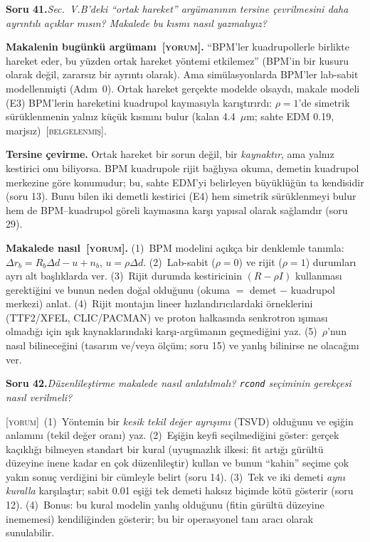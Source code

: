 \documentclass[11pt,a4paper]{article}
\newcommand{\kod}[1]{{\XeTeXinterchartokenstate=0\texttt{#1}}}
\newcommand{\BEL}{\textsc{[belgelenmiş]}}
\newcommand{\YOR}{\textsc{[yorum]}}
\newcounter{soru}
\newcommand{\soru}[2]{%
  \par\medskip\noindent\textbf{Soru #1.}\enspace\textit{#2}\par\nopagebreak\smallskip}
\begin{document}
\soru{41}{Sec.~V.B'deki ``ortak hareket'' argümanının tersine çevrilmesini daha ayrıntılı açıklar mısın?
Makalede bu kısmı nasıl yazmalıyız?}

\textbf{Makalenin bugünkü argümanı~\YOR.} ``BPM'ler kuadrupollerle birlikte hareket eder, bu yüzden ortak
hareket yöntemi etkilemez'' (BPM'in bir kusuru olarak değil, zararsız bir ayrıntı olarak). Ama
simülasyonlarda BPM'ler lab-sabit modellenmişti (Adım~0). Ortak hareket gerçekte modelde olsaydı, makale
modeli (E3) BPM'lerin hareketini kuadrupol kaymasıyla karıştırırdı: $\rho=1$'de simetrik sürüklenmenin
yalnız küçük kısmını bulur (kalan 4.4~$\mu$m; sahte EDM 0.19, marjsız)~\BEL.

\textbf{Tersine çevirme.} Ortak hareket bir sorun değil, bir \emph{kaynaktır}, ama yalnız kestirici onu
biliyorsa. BPM kuadrupole rijit bağlıysa okuma, demetin kuadrupol merkezine göre konumudur; bu, sahte EDM'yi
belirleyen büyüklüğün ta kendisidir (soru 13). Bunu bilen iki demetli kestirici (E4) hem simetrik
sürüklenmeyi bulur hem de BPM--kuadrupol göreli kaymasına karşı yapısal olarak sağlamdır (soru 29).

\textbf{Makalede nasıl~\YOR.} (1)~BPM modelini açıkça bir denklemle tanımla: $\Delta r_b=R_b\Delta d-u+n_b$,
$u=\rho\Delta d$. (2)~Lab-sabit ($\rho=0$) ve rijit ($\rho=1$) durumları ayrı alt başlıklarda ver.
(3)~Rijit durumda kestiricinin $(R-\rho I)$ kullanması gerektiğini ve bunun neden doğal olduğunu
(okuma $=$ demet $-$ kuadrupol merkezi) anlat. (4)~Rijit montajın lineer hızlandırıcılardaki örneklerini
(TTF2/XFEL, CLIC/PACMAN) ve proton halkasında senkrotron ışıması olmadığı için ışık kaynaklarındaki
karşı-argümanın geçmediğini yaz. (5)~$\rho$'nun nasıl bilineceğini (tasarım ve/veya ölçüm; soru 15) ve
yanlış bilinirse ne olacağını ver.

\soru{42}{Düzenlileştirme makalede nasıl anlatılmalı? \kod{rcond} seçiminin gerekçesi nasıl verilmeli?}

\YOR~(1)~Yöntemin bir \emph{kesik tekil değer ayrışımı} (TSVD) olduğunu ve eşiğin anlamını (tekil değer
oranı) yaz. (2)~Eşiğin keyfi seçilmediğini göster: gerçek kaçıklığı bilmeyen standart bir kural
(uyuşmazlık ilkesi: fit artığı gürültü düzeyine inene kadar en çok düzenlileştir) kullan ve bunun ``kahin''
seçime çok yakın sonuç verdiğini bir cümleyle belirt (soru 14). (3)~Tek ve iki demeti \emph{aynı kuralla}
karşılaştır; sabit 0.01 eşiği tek demeti haksız biçimde kötü gösterir (soru 12). (4)~Bonus: bu kural
modelin yanlış olduğunu (fitin gürültü düzeyine inememesi) kendiliğinden gösterir; bu bir operasyonel
tanı aracı olarak sunulabilir.
\end{document}
